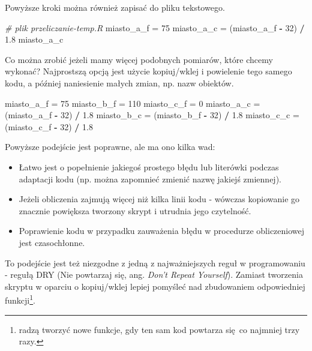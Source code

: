 \documentclass[paper=6in:9in,pagesize=pdftex,headinclude=on,footinclude=on,10pt]{scrbook}
\newenvironment{Shaded}{\begin{snugshade}}{\end{snugshade}}
\newcommand{\CommentTok}[1]{\textcolor[rgb]{0.56,0.35,0.01}{\textit{#1}}}
\newcommand{\DecValTok}[1]{\textcolor[rgb]{0.00,0.00,0.81}{#1}}
\newcommand{\FloatTok}[1]{\textcolor[rgb]{0.00,0.00,0.81}{#1}}
\newcommand{\NormalTok}[1]{#1}
\newcommand{\OperatorTok}[1]{\textcolor[rgb]{0.81,0.36,0.00}{\textbf{#1}}}
\newcommand{\StringTok}[1]{\textcolor[rgb]{0.31,0.60,0.02}{#1}}
\providecommand{\tightlist}{%
  \setlength{\itemsep}{0pt}\setlength{\parskip}{0pt}}
\begin{document}
Powyższe kroki można również zapisać do pliku tekstowego.

\begin{Shaded}
\begin{Highlighting}[]
\CommentTok{# plik przeliczanie-temp.R}
\NormalTok{miasto_a_f =}\StringTok{ }\DecValTok{75}
\NormalTok{miasto_a_c =}\StringTok{ }\NormalTok{(miasto_a_f }\OperatorTok{-}\StringTok{ }\DecValTok{32}\NormalTok{) }\OperatorTok{/}\StringTok{ }\FloatTok{1.8}
\NormalTok{miasto_a_c}
\end{Highlighting}
\end{Shaded}

Co można zrobić jeżeli mamy więcej podobnych pomiarów, które chcemy wykonać?
Najprostszą opcją jest użycie kopiuj/wklej i powielenie tego samego kodu, a później naniesienie małych zmian, np. nazw obiektów.

\begin{Shaded}
\begin{Highlighting}[]
\NormalTok{miasto_a_f =}\StringTok{ }\DecValTok{75}
\NormalTok{miasto_b_f =}\StringTok{ }\DecValTok{110}
\NormalTok{miasto_c_f =}\StringTok{ }\DecValTok{0}
\NormalTok{miasto_a_c =}\StringTok{ }\NormalTok{(miasto_a_f }\OperatorTok{-}\StringTok{ }\DecValTok{32}\NormalTok{) }\OperatorTok{/}\StringTok{ }\FloatTok{1.8}
\NormalTok{miasto_b_c =}\StringTok{ }\NormalTok{(miasto_b_f }\OperatorTok{-}\StringTok{ }\DecValTok{32}\NormalTok{) }\OperatorTok{/}\StringTok{ }\FloatTok{1.8}
\NormalTok{miasto_c_c =}\StringTok{ }\NormalTok{(miasto_c_f }\OperatorTok{-}\StringTok{ }\DecValTok{32}\NormalTok{) }\OperatorTok{/}\StringTok{ }\FloatTok{1.8}
\end{Highlighting}
\end{Shaded}

Powyższe podejście jest poprawne, ale ma ono kilka wad:

\begin{itemize}
\tightlist
\item
  Łatwo jest o popełnienie jakiegoś prostego błędu lub literówki podczas adaptacji kodu (np. można zapomnieć zmienić nazwę jakiejś zmiennej).
\item
  Jeżeli obliczenia zajmują więcej niż kilka linii kodu - wówczas kopiowanie go znacznie powiększa tworzony skrypt i utrudnia jego czytelność.
\item
  Poprawienie kodu w przypadku zauważenia błędu w procedurze obliczeniowej jest czasochłonne.
\end{itemize}

To podejście jest też niezgodne z jedną z najważniejszych reguł w programowaniu - regułą DRY (Nie powtarzaj się, ang. \emph{Don't Repeat Yourself}).
Zamiast tworzenia skryptu w oparciu o kopiuj/wklej lepiej pomyśleć nad zbudowaniem odpowiedniej funkcji\footnote{\citet{wickham2016r} radzą tworzyć nowe funkcje, gdy ten sam kod powtarza się~co najmniej trzy razy.}.
\end{document}
